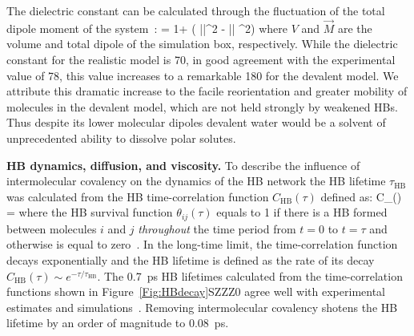 \documentclass[aps,prl,reprint,amsmath,amssymb]{revtex4-1}
\begin{document}
The dielectric constant can be calculated through the fluctuation of the total dipole moment of the system~\cite{neumann1983dipole,adams1981theory}:
%
\bea
\epsilon = 1+  (  \langle ||^2 \rangle  - \langle || \rangle ^2) \label{Eq:dielectric}
\eea
%
where $V$ and $\vec{M}$ are the volume and total dipole of the simulation box, respectively. 
While the dielectric constant for the realistic model is 70, in good agreement with the experimental value of 78, this value increases to a remarkable 180 for the devalent model.
We attribute this dramatic increase to the facile reorientation and greater mobility of molecules in the devalent model, which are not held strongly by weakened HBs. 
Thus despite its lower molecular dipoles devalent water would be a solvent of unprecedented ability to dissolve polar solutes.

\textbf{HB dynamics, diffusion, and viscosity.} To describe the influence of intermolecular covalency on the dynamics of the HB network the HB lifetime $\tau_{\text{HB}}$ was calculated from the HB time-correlation function $C_{\text{HB}}(\tau)$ defined as:
%
\bea
C_{}(\tau) =  \label{Eq:HBdecay}
\eea
%
where the HB survival function $\theta_{ij}(\tau)$ equals to 1 if there is a HB formed between molecules $i$ and $j$ \emph{throughout} the time period from $t=0$ to $t=\tau$ and otherwise is equal to zero~\cite{rapaport1983hydrogen,starr1999fast}. 
In the long-time limit, the time-correlation function decays exponentially and the HB lifetime is defined as the rate of its decay $C_{\text{HB}}(\tau) \sim e^{-\tau/\tau_{\text{HB}}}$. 
The 0.7~ps HB lifetimes calculated from the time-correlation functions shown in Figure~\ref{Fig:HBdecay}SZZZ0 agree well with experimental estimates \cite{lawrence2003ultrafast} and simulations~\cite{marti1996molecular,starr1999fast}. Removing intermolecular covalency shotens the HB lifetime by an order of magnitude to 0.08~ps. 

\end{document}
